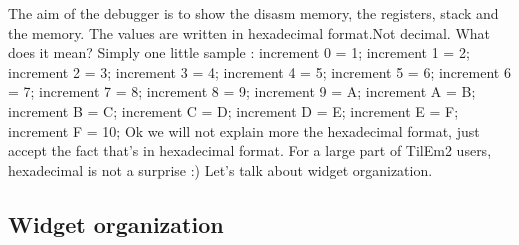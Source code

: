 \documentclass[10pt]{report}
\begin{document}
The aim of the debugger is to show the disasm memory, the registers, stack and the memory.\newline
The values are written in hexadecimal format.Not decimal.\newline
What does it mean?\newline
Simply one little sample :\newline
increment 0 = 1;\newline
increment 1 = 2;\newline
increment 2 = 3;\newline
increment 3 = 4;\newline
increment 4 = 5;\newline
increment 5 = 6;\newline
increment 6 = 7;\newline
increment 7 = 8;\newline
increment 8 = 9;\newline
increment 9 = A;\newline
increment A = B;\newline
increment B = C;\newline
increment C = D;\newline
increment D = E;\newline
increment E = F;\newline
increment F = 10;\newline
Ok we will not explain more the hexadecimal format, just accept the fact that's in hexadecimal format.\newline
For a large part of TilEm2 users, hexadecimal is not a surprise :)\newline\newline
Let's talk about widget organization.\newline


\subsection{Widget organization}
\end{document}
